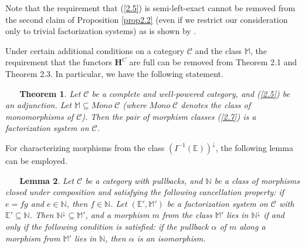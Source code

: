 \documentclass[12pt,reqno,intlim]{amsart}
\numberwithin{equation}{section}
\newtheorem{theo}{\ \ \ Theorem}[section]
\newtheorem{lem}[theo]{\ \ \ Lemma}
\theoremstyle{definition}
\theoremstyle{remark}
\newtheorem{rem}[theo]{\ \ \ Remark}
\begin{document}
Note that the requirement that (\ref{2.5}) is semi-left-exact cannot be removed from the second claim of Proposition \ref{prop2.2} (even if we restrict our consideration only to trivial factorization systems) as is shown by \cite[Example 4.2]{CHK}. 

Under certain additional conditions on a category $\mathcal{C}$ and the class $\mathbb{M}$, the requirement that the functors $\mathbf{H}^{C}$ are full can be removed from Theorem 2.1 and Theorem 2.3. In particular, we have the following statement.


\begin{theo}  \cite[Theorem 5.4]{Z3} \label{th2.3}
Let $\mathcal{C}$ be a complete and well-powered category, and (\ref{2.5}) be an adjunction. Let $\mathbb{M}\subseteq Mono\; \mathcal{C}$ (where $Mono\; \mathcal{C}$ denotes the class of monomorphisms of $\mathcal{C}$). Then the pair of morphism classes (\ref{2.7})
is a factorization system on $\mathcal{C}$.
\end{theo}

For characterizing morphisms from the class $(I^{-1}(\mathbb{E}))^{\downarrow}$, the following lemma can be employed.
\begin{lem} \cite[Lemma 5.5]{Z3} \label{lem2.4}
Let $\mathcal{C}$ be a category with pullbacks, and $\mathbb{N}$ be a class of morphisms closed under composition and satisfying the following cancellation property: if $e=fg$ and $e\in \mathbb{N}$, then $f\in \mathbb{N}$. Let $(\mathbb{E}',\mathbb{M}')$ be a factorization system on $\mathcal{C}$ with $\mathbb{E'}\subseteq \mathbb{N}$. Then $\mathbb{N}^{\downarrow}\subseteq \mathbb{M}'$, and a morphism $m$ from the class $\mathbb{M}'$ lies in $\mathbb{N}^{\downarrow}$ if and only if the following condition is satisfied: if the pullback $\alpha$ of $m$ along a morphism from $\mathbb{M}'$ lies in $\mathbb{N}$, then $\alpha$ is an isomorphism.
\end{lem}

\end{document}
